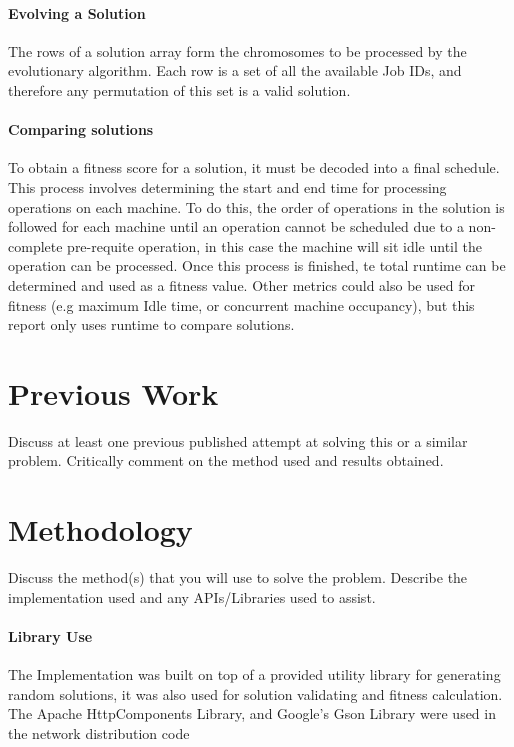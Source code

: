 \documentclass[14pt]{acmsiggraph}
\begin{document}
\paragraph{Evolving a Solution}
The rows of a solution array form the chromosomes to be processed by the evolutionary algorithm. Each row is a set of all the available Job IDs, and therefore any permutation of this set is a valid solution. 

\paragraph{Comparing solutions}
To obtain a fitness score for a solution, it must be decoded into a final schedule. This process involves determining the start and end time for processing operations on each machine. To do this, the order of operations in the solution is followed for each machine until an operation cannot be scheduled due to a non-complete pre-requite operation, in this case the machine will sit idle until the operation can be processed. Once this process is finished, te total runtime can be determined and used as a fitness value. Other metrics could also be used for fitness (e.g maximum Idle time, or concurrent machine occupancy), but this report only uses runtime to compare solutions.

\section{Previous  Work}
Discuss at least one previous published attempt at solving this or a similar problem. 
Critically comment on the method used and results obtained.
\lipsum[7]
\cite{gonzalez2013efficient}

\cite{gao2011efficient}

\cite{zhang2011effective}

\cite{driss2015effective}

\cite{wang2012new}

\section{Methodology}
Discuss the method(s) that you will use to solve the problem. 
Describe the implementation used and any APIs/Libraries used to assist.
\paragraph{Library Use}
The Implementation was built on top of a provided utility library for generating random solutions, it was also used for solution validating and fitness calculation.\\
The Apache HttpComponents Library, and Google's Gson Library were used in the network distribution code
\end{document}
